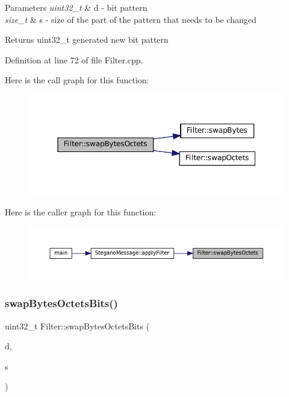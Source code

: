 \begin{DoxyParams}{Parameters}
{\em uint32\+\_\+t} & d -\/ bit pattern \\
\hline
{\em size\+\_\+t} & s -\/ size of the part of the pattern that needs to be changed \\
\hline
\end{DoxyParams}
\begin{DoxyReturn}{Returns}
uint32\+\_\+t generated new bit pattern 
\end{DoxyReturn}


Definition at line 72 of file Filter.\+cpp.

Here is the call graph for this function\+:\nopagebreak
\begin{figure}[H]
\begin{center}
\leavevmode
\includegraphics[width=350pt]{classFilter_a55c046859fbbb468536cae5c1f95c702_cgraph}
\end{center}
\end{figure}
Here is the caller graph for this function\+:\nopagebreak
\begin{figure}[H]
\begin{center}
\leavevmode
\includegraphics[width=350pt]{classFilter_a55c046859fbbb468536cae5c1f95c702_icgraph}
\end{center}
\end{figure}
\mbox{\label{classFilter_a9c8e2eb790e7e9dff6493a12a1fefc4f}} 
\subsubsection{\texorpdfstring{swapBytesOctetsBits()}{swapBytesOctetsBits()}}
{\footnotesize\ttfamily uint32\+\_\+t Filter\+::swap\+Bytes\+Octets\+Bits (\begin{DoxyParamCaption}\item[{uint32\+\_\+t}]{d,  }\item[{size\+\_\+t}]{s }\end{DoxyParamCaption})\hspace{0.3cm}{\ttfamily [static]}}



